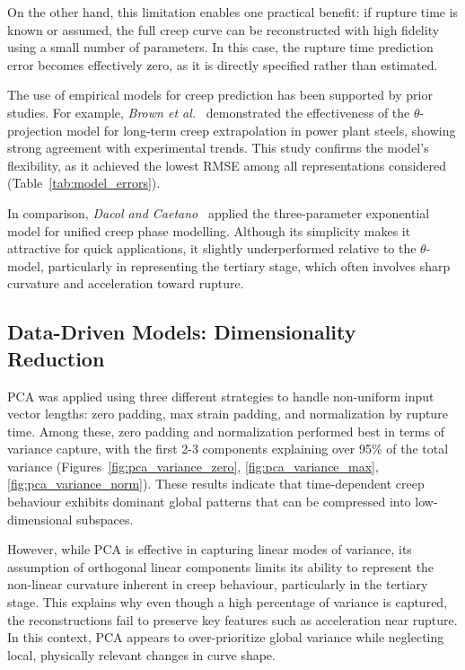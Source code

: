 \documentclass[class=scrbook, crop=false]{standalone}
\begin{document}
On the other hand, this limitation enables one practical benefit: if rupture time is known or assumed, the full creep curve can be reconstructed with high fidelity using a small number of parameters. In this case, the rupture time prediction error becomes effectively zero, as it is directly specified rather than estimated.

The use of empirical models for creep prediction has been supported by prior studies. For example, \textit{Brown et al.}~\cite{brown2002extrapolation} demonstrated the effectiveness of the $\theta$-projection model for long-term creep extrapolation in power plant steels, showing strong agreement with experimental trends. This study confirms the model’s flexibility, as it achieved the lowest RMSE among all representations considered (Table~\ref{tab:model_errors}).

In comparison, \textit{Dacol and Caetano}~\cite{dacol2022modelling} applied the three-parameter exponential model for unified creep phase modelling. Although its simplicity makes it attractive for quick applications, it slightly underperformed relative to the $\theta$-model, particularly in representing the tertiary stage, which often involves sharp curvature and acceleration toward rupture.

\subsection{Data-Driven Models: Dimensionality Reduction}

PCA was applied using three different strategies to handle non-uniform input vector lengths: zero padding, max strain padding, and normalization by rupture time. Among these, zero padding and normalization performed best in terms of variance capture, with the first 2-3 components explaining over 95\% of the total variance (Figures~\ref{fig:pca_variance_zero}, \ref{fig:pca_variance_max}, \ref{fig:pca_variance_norm}). These results indicate that time-dependent creep behaviour exhibits dominant global patterns that can be compressed into low-dimensional subspaces.

However, while PCA is effective in capturing linear modes of variance, its assumption of orthogonal linear components limits its ability to represent the non-linear curvature inherent in creep behaviour, particularly in the tertiary stage. This explains why even though a high percentage of variance is captured, the reconstructions fail to preserve key features such as acceleration near rupture. In this context, PCA appears to over-prioritize global variance while neglecting local, physically relevant changes in curve shape.
\end{document}
